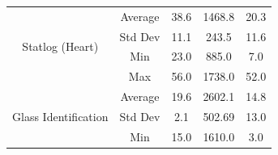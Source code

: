 \documentclass[journal]{IEEEtran}
\begin{document}
\begin{table}[]
\begin{tabular}{|c|c|c|c|c|}
			\multirow{4}{*}{Statlog (Heart)}       & Average                                  & 38.6                                                                                          & 1468.8                                                                                                          & 20.3                                                                                                \\ \cline{2-5} 
			& Std Dev                                  & 11.1                                                                                          & 243.5                                                                                                           & 11.6                                                                                                \\ \cline{2-5} 
			& Min                                      & 23.0                                                                                          & 885.0                                                                                                           & 7.0                                                                                                 \\ \cline{2-5} 
			& Max                                      & 56.0                                                                                          & 1738.0                                                                                                          & 52.0                                                                                                \\ \hline
			\multirow{4}{*}{Glass Identification}  & Average                                  & 19.6                                                                                          & 2602.1                                                                                                          & 14.8                                                                                                \\ \cline{2-5} 
			& Std Dev                                  & 2.1                                                                                           & 502.69                                                                                                          & 13.0                                                                                                \\ \cline{2-5} 
			& Min                                      & 15.0                                                                                          & 1610.0                                                                                                          & 3.0                                                                                                 \\ \cline{2-5} 

\end{tabular}
\end{table}
\end{document}

